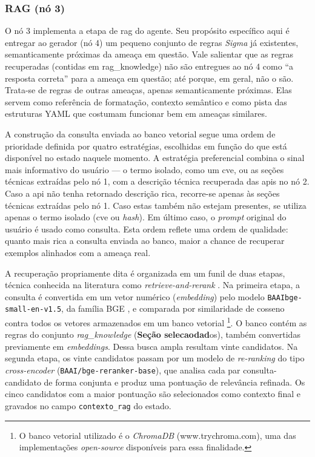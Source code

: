\subsubsection{RAG (nó 3)}

O nó 3 implementa a etapa de \gls{rag} do agente. 
Seu propósito específico aqui é entregar ao gerador (nó 4) um pequeno conjunto de regras \textit{Sigma} já existentes, semanticamente próximas da ameaça em questão. 
Vale salientar que as regras recuperadas (contidas em rag\_knowledge) não são entregues ao nó 4 como ``a resposta correta'' para a ameaça em questão; até porque, em geral, não o são. 
Trata-se de regras de outras ameaças, apenas semanticamente próximas. 
Elas servem como referência de formatação, contexto semântico e como pista das estruturas YAML que costumam funcionar bem em ameaças similares.

A construção da consulta enviada ao banco vetorial segue uma ordem de prioridade definida por quatro estratégias, escolhidas em função do que está disponível no estado naquele momento. 
A estratégia preferencial combina o sinal mais informativo do usuário --- o termo isolado, como um \gls{cve}, ou as seções técnicas extraídas pelo nó 1, com a descrição técnica recuperada das \gls{api}s no nó 2. 
Caso a \gls{api} não tenha retornado descrição rica, recorre-se apenas às seções técnicas extraídas pelo nó 1. 
Caso estas também não estejam presentes, se utiliza apenas o termo isolado (\gls{cve} ou \textit{hash}).
Em último caso, o \textit{prompt} original do usuário é usado como consulta. 
Esta ordem reflete uma ordem de qualidade: quanto mais rica a consulta enviada ao banco, maior a chance de recuperar exemplos alinhados com a ameaça real.

A recuperação propriamente dita é organizada em um funil de duas etapas, técnica conhecida na literatura como \textit{retrieve-and-rerank} \cite{nogueira2019passage}. 
Na primeira etapa, a consulta é convertida em um vetor numérico (\textit{embedding}) pelo modelo \texttt{BAAI\/bge-small-en-v1.5}, da família BGE \cite{xiao2023bge}, e comparada por similaridade de cosseno contra todos os vetores armazenados em um banco vetorial
\footnote{O banco vetorial utilizado é o \textit{ChromaDB} (www.trychroma.com), uma das implementações \textit{open-source} disponíveis para essa finalidade.}. 
O banco contém as regras do conjunto \textit{rag\_knowledge} (\textbf{Seção selecaodad}os), também convertidas previamente em \textit{embeddings}. 
Dessa busca ampla resultam vinte candidatos. 
Na segunda etapa, os vinte candidatos passam por um modelo de \textit{re-ranking} do tipo \textit{cross-encoder} (\texttt{BAAI/bge-reranker-base}), que analisa cada par consulta-candidato de forma conjunta e produz uma pontuação de relevância refinada. 
Os cinco candidatos com a maior pontuação são selecionados como contexto final e gravados no campo \texttt{contexto\_rag} do estado.

